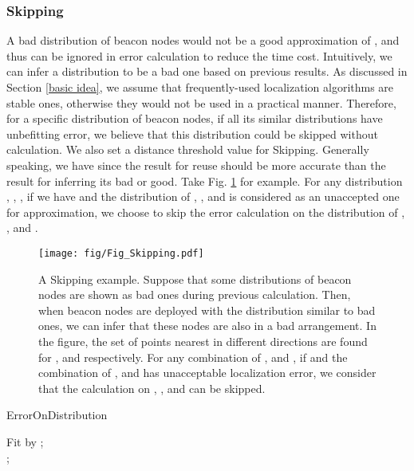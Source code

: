 \documentclass[10pt, conference, letterpaper]{IEEEtran}
\begin{document}
\subsubsection{Skipping} \label{skipping}
A bad distribution of beacon nodes would not be a good approximation of , and thus can be ignored in error calculation to reduce the time cost. Intuitively, we can infer a distribution to be a bad one based on previous results. As discussed in Section \ref{basic idea}, we assume that frequently-used localization algorithms are stable ones, otherwise they would not be used in a practical manner. Therefore, for a specific distribution of beacon nodes, if all its similar distributions have unbefitting error, we believe that this distribution could be skipped without calculation. We also set a distance threshold value  for Skipping. Generally speaking, we have  since the result for reuse should be more accurate than the result for inferring its bad or good. Take Fig. \ref{Fig_Skipping} for example. For any distribution , , , if we have  and the distribution of , , and  is considered as an unaccepted one for approximation, we choose to skip the error calculation on the distribution of , , and .
\begin{figure}
\centering
\texttt{[image: fig/Fig\_Skipping.pdf]}\\
\caption{\textrm{A Skipping example. Suppose that some distributions of beacon nodes are shown as bad ones during previous calculation. Then, when beacon nodes are deployed with the distribution similar to bad ones, we can infer that these nodes are also in a bad arrangement. In the figure, the set of points nearest in different directions are found for ,  and  respectively. For any combination of ,  and , if  and the combination of ,  and  has unacceptable localization error, we consider that the calculation on , , and  can be skipped.}} \label{Fig_Skipping}
\end{figure}

\begin{algorithm} \label{ErrorOnDistribution}
\caption{ErrorOnDistribution}
Fit  by ;\\
\Return ;
\end{algorithm}
\end{document}
